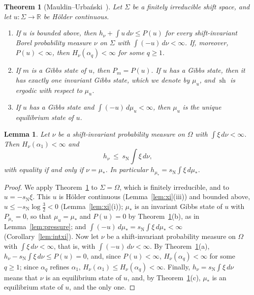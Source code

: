 \documentclass[11pt]{amsart}
\newtheorem{lettertheorem}{Theorem}%
\newtheorem{lemma}[proposition]{Lemma}
\theoremstyle{definition}
\theoremstyle{remark}
\newcommand{\R}{\mathbb R}
\newcommand{\sN}{s_{\mathrm N}}
\begin{document}
\begin{lettertheorem}[Mauldin--Urba\'nski~\cite{MU03}]\label{thm:MU}
Let $\Sigma$ be a finitely irreducible shift space, and let $u:\Sigma\to\R$ be H\"older continuous.
\begin{enumerate}
\item[(a)] \cite[Thm.~2.1.7]{MU03} If $u$ is bounded above, then $h_\nu+\int u\,d\nu\le P(u)$ for every shift-invariant Borel probability measure $\nu$ on $\Sigma$ with $\int(-u)\,d\nu<\infty$. If, moreover, $P(u)<\infty$, then $H_\nu(\alpha_q)<\infty$ for some $q\ge1$.
\item[(b)] \cite[Prop.~2.2.2(a) and Thm.~2.2.4]{MU03} If $m$ is a Gibbs state of $u$, then $P_m=P(u)$. If $u$ has a Gibbs state, then it has exactly one invariant Gibbs state, which we denote by $\mu_u$, and $\operatorname{sh}$ is ergodic with respect to $\mu_u$.
\item[(c)] \cite[Thm.~2.2.9]{MU03} If $u$ has a Gibbs state and $\int(-u)\,d\mu_u<\infty$, then $\mu_u$ is the unique equilibrium state of $u$.
\end{enumerate}
\end{lettertheorem}

\begin{lemma}\label{lem:maxent}
Let $\nu$ be a shift-invariant probability measure on $\Omega$ with $\int\xi\,d\nu<\infty$. Then $H_\nu(\alpha_1)<\infty$ and
\[
  h_\nu\ \le\ \sN\int\xi\,d\nu ,
\]
with equality if and only if $\nu=\mu_*$. In particular $h_{\mu_*}=\sN\int\xi\,d\mu_*$.
\end{lemma}

\begin{proof}
We apply Theorem~\ref{thm:MU} to $\Sigma=\Omega$, which is finitely irreducible, and to $u=-\sN\xi$. This $u$ is H\"older continuous (Lemma~\ref{lem:xi}(iii)) and bounded above, $u\le-\sN\log\frac32<0$ (Lemma~\ref{lem:xi}(i)); $\mu_*$ is an invariant Gibbs state of $u$ with $P_{\mu_*}=0$, so that $\mu_u=\mu_*$ and $P(u)=0$ by Theorem~\ref{thm:MU}(b), as in Lemma~\ref{lem:pressure}; and $\int(-u)\,d\mu_*=\sN\int\xi\,d\mu_*<\infty$ (Corollary~\ref{lem:intxi}).
Now let $\nu$ be a shift-invariant probability measure on $\Omega$ with $\int\xi\,d\nu<\infty$, that is, with $\int(-u)\,d\nu<\infty$. By Theorem~\ref{thm:MU}(a), $h_\nu-\sN\int\xi\,d\nu\le P(u)=0$, and, since $P(u)<\infty$, $H_\nu(\alpha_q)<\infty$ for some $q\ge1$; since $\alpha_q$ refines $\alpha_1$, $H_\nu(\alpha_1)\le H_\nu(\alpha_q)<\infty$. Finally, $h_\nu=\sN\int\xi\,d\nu$ means that $\nu$ is an equilibrium state of $u$, and, by Theorem~\ref{thm:MU}(c), $\mu_*$ is an equilibrium state of $u$, and the only one.
\end{proof}
\end{document}
